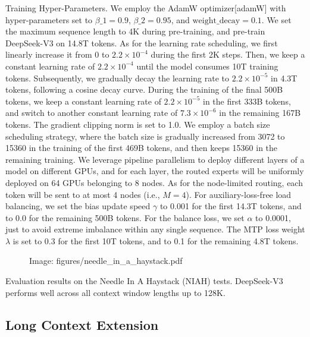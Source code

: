 \documentclass[11pt,a4paper]{article}
\begin{document}
Training Hyper-Parameters.
We employ the AdamW optimizer[adamW] with hyper-parameters set to $\beta\_1=0.9$, $\beta\_2=0.95$, and $\mathrm{weight\_decay}=0.1$. 
We set the maximum sequence length to 4K during pre-training, and pre-train DeepSeek-V3 on 14.8T tokens. 
As for the learning rate scheduling, we first linearly increase it from 0 to $2.2 \times 10^{-4}$ during the first 2K steps. 
Then, we keep a constant learning rate of $2.2 \times 10^{-4}$ until the model consumes 10T training tokens. 
Subsequently, we gradually decay the learning rate to $2.2 \times 10^{-5}$ in 4.3T tokens, following a cosine decay curve. 
During the training of the final 500B tokens, we keep a constant learning rate of $2.2 \times 10^{-5}$ in the first 333B tokens, and switch to another constant learning rate of $7.3 \times 10^{-6}$ in the remaining 167B tokens. 
The gradient clipping norm is set to 1.0.
We employ a batch size scheduling strategy, where the batch size is gradually increased from 3072 to 15360 in the training of the first 469B tokens, and then keeps 15360 in the remaining training. 
We leverage pipeline parallelism to deploy different layers of a model on different GPUs, and for each layer, the routed experts will be uniformly deployed on 64 GPUs belonging to 8 nodes. 
As for the node-limited routing, each token will be sent to at most 4 nodes (i.e., $M=4$). 
For auxiliary-loss-free load balancing, we set the bias update speed $\gamma$ to 0.001 for the first 14.3T tokens, and to 0.0 for the remaining 500B tokens. 
For the balance loss, we set $\alpha$ to 0.0001, just to avoid extreme imbalance within any single sequence. 
The MTP loss weight $\lambda$ is set to 0.3 for the first 10T tokens, and to 0.1 for the remaining 4.8T tokens.

\begin{figure}[h]
\caption{Image: figures/needle\_in\_a\_haystack.pdf}
\end{figure}

Evaluation results on the Needle In A Haystack (NIAH) tests. 
DeepSeek-V3 performs well across all context window lengths up to 128K.

\subsection{Long Context Extension}
\end{document}

